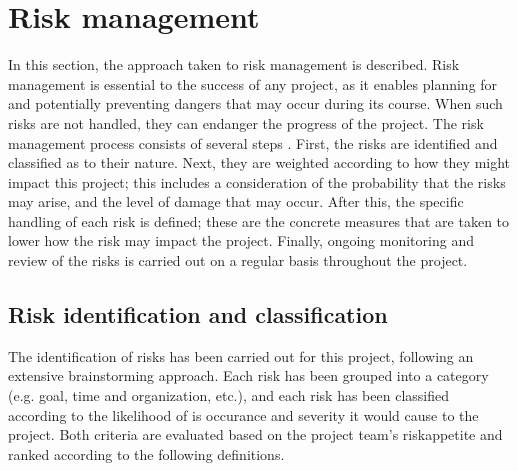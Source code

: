 \section{Risk management}
\label{ProjMgmtRisk}


In this section, the approach taken to risk management is described. Risk management is essential to the success of any project, as it enables planning for and potentially preventing dangers that may occur during its course. When such risks are not handled, they can endanger the progress of the project. The risk management process consists of several steps \cite{RiskmgmtWikipedia}. First, the risks are identified and classified as to their nature. Next, they are weighted according to how they might impact this project; this includes a consideration of the probability that the risks may arise, and the level of damage that may occur. After this, the specific handling of each risk is defined; these are the concrete measures that are taken to lower how the risk may impact the project. Finally, ongoing monitoring and review of the risks is carried out on a regular basis throughout the project.

\subsection*{Risk identification and classification}

The identification of risks has been carried out for this project, following an extensive brainstorming approach. Each risk has been grouped into a category (e.g. goal, time and organization, etc.), and each risk has been classified according to the likelihood of is occurance and severity it would cause to the project. Both criteria are evaluated based on the project team’s \gls{riskappetite} and ranked according to the following definitions.

